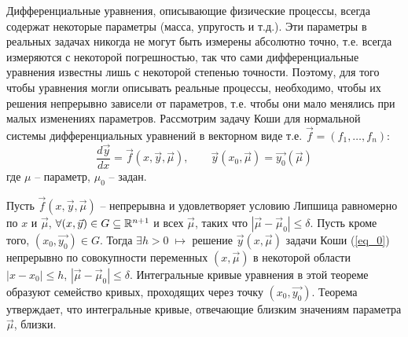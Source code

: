Дифференциальные уравнения, описывающие физические
процессы, всегда содержат некоторые параметры (масса,
упругость и т.д.). Эти параметры в реальных задачах
никогда не могут быть измерены абсолютно точно, т.е.
всегда измеряются с некоторой погрешностью, так что
сами дифференциальные уравнения известны лишь с некоторой степенью точности. Поэтому, для того чтобы
уравнения могли описывать реальные процессы, необходимо, чтобы их решения непрерывно зависели от параметров, т.е. чтобы они мало менялись при малых изменениях параметров.
\bigbreak
Рассмотрим задачу Коши для нормальной системы дифференциальных уравнений в векторном виде т.е. $ \vec{f}=(f_1,\ldots,f_n)$:
\setcounter{equation}{0}
\begin{equation}\label{eq_0}
    \frac{d\vec{y}}{dx}=\vec{f}(x,\vec{y},\vec{\mu}), \qquad \vec{y}(x_0,\vec{\mu})=\vec{y_0}(\vec{\mu})
\end{equation}
где $\mu$ -- параметр, $\mu_0$ -- задан.
\bigbreak
\par \Th  Пусть $\vec{f}(x,\vec{y},\vec{\mu})$ -- непрерывна и удовлетворяет условию Липшица равномерно по $x$ и $\vec{\mu}$, $\forall (x,\vec{y}) \in G \subseteq \mathbb{R}^{n+1}$ и всех $\vec{\mu}$, таких что $|\vec{\mu} - \vec{\mu}_0| \leqslant \delta$. Пусть кроме того, $(x_0,\vec{y_0}) \in G$. \newline Тогда $\exists h > 0 \;\mapsto$ решение $\vec{y}(x,\vec{\mu})$ задачи Коши (\ref{eq_0}) непрерывно по совокупности переменных $(x,\vec{\mu})$ в некоторой области $|x-x_0|\leqslant h$, $|\vec{\mu}-\vec{\mu}_0|\leqslant \delta$.
\bigbreak
\Note Интегральные кривые уравнения в этой теореме образуют семейство кривых, проходящих через точку $(x_0,\vec{y_0})$. Теорема утверждает, что интегральные кривые, отвечающие близким значениям параметра $\vec{\mu}$, близки.